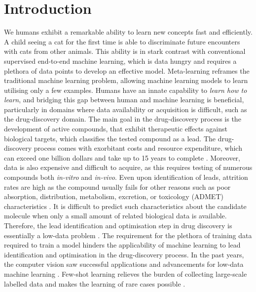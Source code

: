 \section{Introduction}

We humans exhibit a remarkable ability to learn new concepts fast and efficiently. A child seeing a cat for the first time is able to discriminate future encounters with cats from other animals. This ability is in stark contrast with conventional supervised end-to-end machine learning, which is data hungry and requires a plethora of data points to develop an effective model. Meta-learning reframes the traditional machine learning problem, allowing machine learning models to learn utilising only a few examples. Humans have an innate capability to \textit{learn how to learn}, and bridging this gap between human and machine learning is beneficial, particularly in domains where data availability or acquisition is difficult, such as the drug-discovery domain. The main goal in the drug-discovery process is the development of active compounds, that exhibit therapeutic effects against biological targets, which classifies the tested compound as a lead. The drug-discovery process comes with exorbitant costs and resource expenditure, which can exceed one billion dollars and take up to 15 years to complete \cite{hughes2011principles}. Moreover, data is also expensive and difficult to acquire, as this requires testing of numerous compounds both \textit{in-vitro} and \textit{in-vivo}. Even upon identification of leads, attrition rates are high as the compound usually fails for other reasons such as poor absorption, distribution, metabolism, excretion, or toxicology (ADMET) characteristics \cite{waring2015analysis}. It is difficult to predict such characteristics about the candidate molecule when only a small amount of related biological data is available. Therefore, the lead identification and optimisation step in drug discovery is essentially a low-data problem \cite{altae2017low}. The requirement for the plethora of training data required to train a model hinders the applicability of machine learning to lead identification and optimisation in the drug-discovery process. In the past years, the computer vision saw successful applications and advancements for low-data machine learning \cite{koch2015siamese, vinyals2016matching, snell2017prototypical, sung2018learning}. Few-shot learning relieves the burden of collecting large-scale labelled data and makes the learning of rare cases possible \cite{wang2020generalizing}. 

